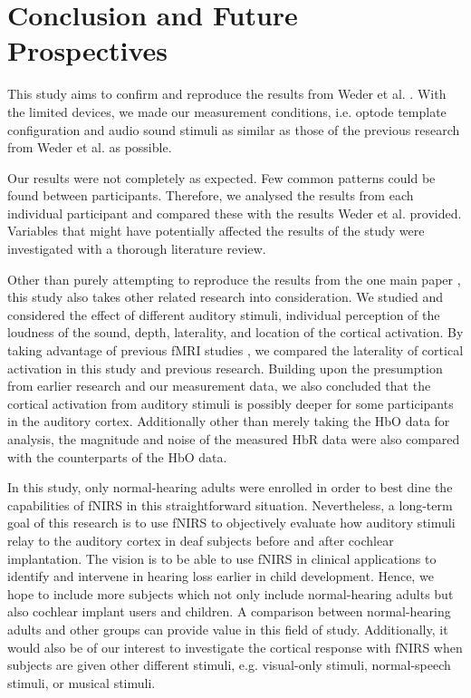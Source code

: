 \chapter{Conclusion and Future Prospectives}
This study aims to confirm and reproduce the results from Weder et al. \citeyearpar {Weder2018}. With the limited devices, we made our measurement conditions, i.e. optode template configuration and audio sound stimuli as similar as those of the previous research from Weder et al. \citeyearpar{Weder2018} as possible.

Our results were not completely as expected. Few common patterns could be found between participants. Therefore,  we analysed the results from each individual participant and compared these with the results Weder et al. \citeyearpar{Weder2018} provided. Variables that might have potentially affected the results of the study were investigated with a thorough literature review.

Other than purely attempting to reproduce the results from the one main paper \citep{Weder2018}, this study also takes other related research into consideration.  We studied and considered the effect of different auditory stimuli, individual perception of the loudness of the sound, depth, laterality, and location of the cortical activation. By taking advantage of previous fMRI studies \citep{Belin2000} \citep{Belin2002} \citep{Hall} \citep{Frost1999-vs}, we compared the laterality of cortical activation in this study and previous research. Building upon the presumption from earlier research and our measurement data, we also concluded that the cortical activation from auditory stimuli is possibly deeper for some participants in the auditory cortex. Additionally other than merely taking the HbO data for analysis, the magnitude and noise of the measured HbR data were also compared with the counterparts of the HbO data.

In this study, only normal-hearing adults were enrolled in order to best dine the capabilities of fNIRS in this straightforward situation. Nevertheless, a long-term goal of this research is to use fNIRS to objectively evaluate how auditory stimuli relay to the auditory cortex in deaf subjects before and after cochlear implantation. The vision is to be able to use fNIRS in clinical applications to identify and intervene in hearing loss earlier in child development. Hence, we hope to include more subjects which not only include normal-hearing adults but also cochlear implant users and children. A comparison between normal-hearing adults and other groups can provide value in this field of study. Additionally, it would also be of our interest to investigate the cortical response with fNIRS when subjects are given other different stimuli, e.g. visual-only stimuli, normal-speech stimuli, or musical stimuli.